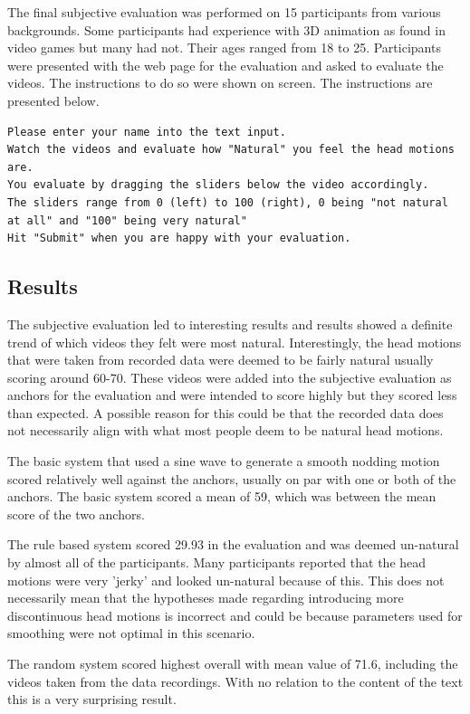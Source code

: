 \documentclass[bsc,frontabs,twoside,singlespacing,parskip,deptreport]{infthesis}
\begin{document}
The final subjective evaluation was performed on 15 participants from various backgrounds. Some participants had experience with 3D animation as found in video games but many had not. Their ages ranged from 18 to 25. Participants were presented with the web page for the evaluation and asked to evaluate the videos. The instructions to do so were shown on screen. The instructions are presented below.

\begin{lstlisting}
Please enter your name into the text input.
Watch the videos and evaluate how "Natural" you feel the head motions are.
You evaluate by dragging the sliders below the video accordingly.
The sliders range from 0 (left) to 100 (right), 0 being "not natural at all" and "100" being very natural"
Hit "Submit" when you are happy with your evaluation.
\end{lstlisting}


\subsection{Results}

The subjective evaluation led to interesting results and results showed a  definite trend of which videos they felt were most natural. Interestingly, the head motions that were taken from recorded data were deemed to be fairly natural usually scoring around 60-70. These videos were added into the subjective evaluation as anchors for the evaluation and were intended to score highly but they scored less than expected. A possible reason for this could be that the recorded data does not necessarily align with what most people deem to be natural head motions.

The basic system that used a sine wave to generate a smooth nodding motion scored relatively well against the anchors, usually on par with one or both of the anchors. The basic system scored a mean of 59, which was between the mean score of the two anchors.

The rule based system scored 29.93 in the evaluation and was deemed un-natural by almost all of the participants. Many participants reported that the head motions were very 'jerky' and looked un-natural because of this. This does not necessarily mean that the hypotheses made regarding introducing more discontinuous head motions is incorrect and could be because parameters used for smoothing were not optimal in this scenario.

The random system scored highest overall with mean value of 71.6, including the videos taken from the data recordings. With no relation to the content of the text this is a very surprising result. 
\end{document}
